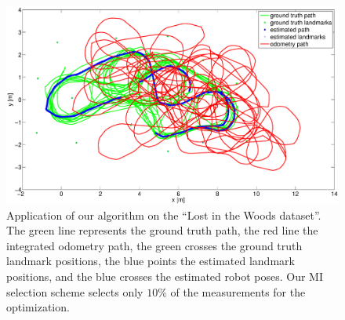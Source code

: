 \begin{figure}[t]
\centering
\includegraphics[width=\columnwidth]{fig/dataset2-path-result.eps}
\caption{Application of our algorithm on the ``Lost in the Woods dataset''. The
  green line represents the ground truth path, the red line the integrated
  odometry path, the green crosses the ground truth landmark positions, the blue
  points the estimated landmark positions, and the blue crosses the estimated
  robot poses. Our MI selection scheme selects only $10\%$ of the measurements
  for the optimization.}
\label{fig:dataset2-path-result}
\end{figure}

